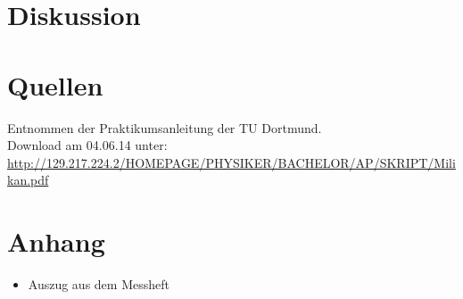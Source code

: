 \documentclass[11pt,ngerman,a4paper]{article}
\begin{document}
\section{Diskussion}

\section{Quellen}
\begin{enumerate}[{[}1{]}]
\item Entnommen der Praktikumsanleitung \textit{} der TU Dortmund. \\
Download am 04.06.14 unter:\\
 \url{http://129.217.224.2/HOMEPAGE/PHYSIKER/BACHELOR/AP/SKRIPT/Milikan.pdf}
\end{enumerate}
\section{Anhang}
\begin{itemize}
\item Auszug aus dem Messheft
\end{itemize}
\end{document}
